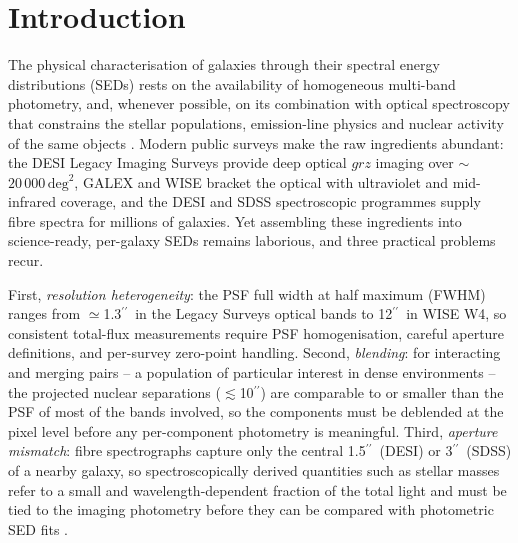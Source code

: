 \documentclass{aa}
\newcommand{\arcsecond}{\ensuremath{^{\prime\prime}}}
\begin{document}

\maketitle

\section{Introduction}
\label{sec:intro}

The physical characterisation of galaxies through their spectral energy
distributions (SEDs) rests on the availability of homogeneous multi-band
photometry, and, whenever possible, on its combination with optical
spectroscopy that constrains the stellar populations, emission-line
physics and nuclear activity of the same objects
\citep[e.g.][]{boquien2019,zou2024}. Modern public surveys make the raw
ingredients abundant: the DESI Legacy Imaging Surveys \citep{dey2019}
provide deep optical $grz$ imaging over $\sim$$20\,000\,\mathrm{deg}^2$,
GALEX \citep{martin2005} and WISE \citep{wright2010} bracket the optical
with ultraviolet and mid-infrared coverage, and the DESI and SDSS
spectroscopic programmes \citep{desi2024,york2000} supply fibre spectra
for millions of galaxies. Yet assembling these ingredients into
science-ready, per-galaxy SEDs remains laborious, and three practical
problems recur.

First, \emph{resolution heterogeneity}: the PSF full width at half maximum
(FWHM) ranges from $\simeq$1.3\arcsecond\ in the Legacy Surveys optical
bands to 12\arcsecond\ in WISE W4, so consistent total-flux measurements
require PSF homogenisation, careful aperture definitions, and
per-survey zero-point handling. Second, \emph{blending}: for interacting
and merging pairs -- a population of particular interest in dense
environments -- the projected nuclear separations
($\lesssim$10\arcsecond) are comparable to or smaller than the PSF of
most of the bands involved, so the components must be deblended at the
pixel level before any per-component photometry is meaningful. Third,
\emph{aperture mismatch}: fibre spectrographs capture only the central
1.5\arcsecond\ (DESI) or 3\arcsecond\ (SDSS) of a nearby galaxy, so
spectroscopically derived quantities such as stellar masses refer to a
small and wavelength-dependent fraction of the total light and must be
tied to the imaging photometry before they can be compared with
photometric SED fits \citep{zou2024}.
\end{document}
